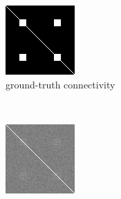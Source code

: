 \begin{figure}[p] 
  \centering 
  \begin{subfigure}[t]{0.3\textwidth}
    \centering
    \includegraphics[width=\textwidth]{figures/method1/newtoy/trueConn}
    \caption{ground-truth connectivity}
    \label{fig:6dconn1}
    \end{subfigure}
~
  \begin{subfigure}[t]{0.3\textwidth}
    \centering
    \includegraphics[width=\textwidth]{figures/method1/newtoy/corrNoSmooth}

\end{subfigure}
\end{figure}
